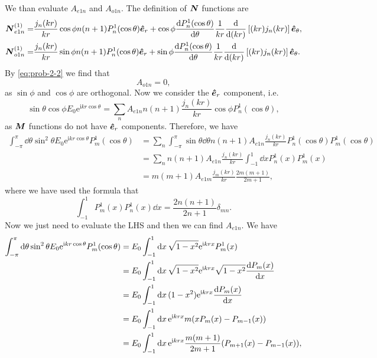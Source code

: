 \documentclass[hyperref, a4paper]{article}
\newcommand*{\ii}{\mathrm{i}}
\newcommand*{\ee}{\mathrm{e}}
\begin{document}
We than evaluate $A_{e1n}$ and $A_{o1n}$. The definition of $\vb*{N}$ functions are
\begin{equation}
    \begin{aligned}
        \boldsymbol{N}^{(1)}_{e 1 n}=& \frac{j_{n}(k r)}{k r} \cos \phi n(n+1) P_{n}^{1}(\cos \theta) \vu*{e}_{r} +\cos \phi \frac{\mathrm{d} P_{n}^{1}(\cos \theta)}{\mathrm{d} \theta} \frac{1}{k r} \frac{\mathrm{d}}{\mathrm{d}(k r)}\left[(k r) j_{n}(k r)\right] \vu*{e}_{\theta} , \\
        \boldsymbol{N}^{(1)}_{o 1 n}=& \frac{j_{n}(k r)}{k r} \sin \phi n(n+1) P_{n}^{1}(\cos \theta) \vu*{e}_{r} +\sin \phi \frac{\mathrm{d} P_{n}^{1}(\cos \theta)}{\mathrm{d} \theta} \frac{1}{k r} \frac{\mathrm{d}}{\mathrm{d}(k r)}\left[(k r) j_{n}(k r)\right] \vu*{e}_{\theta} .
        \end{aligned}
\end{equation}
By \eqref{eq:prob-2-2} we find that 
\begin{equation}
    A_{o1n} = 0,
    \label{eq:ao1n-0}
\end{equation}
as $\sin \phi$ and $\cos \phi$ are orthogonal. Now we consider the $\vu*{e}_r$ component, i.e.
\[
    \sin\theta \cos\phi E_0 \ee^{\ii k r \cos\theta} = \sum_n A_{e1n} n(n+1) \frac{j_n(kr)}{kr} \cos \phi P_{n}^{1}(\cos \theta),
\] 
as $\vb*{M}$ functions do not have $\vu*{e}_r$ components.
Therefore, we have 
\begin{equation}
    \begin{aligned}
        \int_{-\pi}^\pi \dd{\theta} \sin^2\theta E_0 \ee^{\ii k r \cos\theta} P_m^1(\cos\theta) &= \sum_n \int_{-\pi}^\pi \sin\theta \dd{\theta} n(n+1) A_{e1n} \frac{j_n(kr)}{kr} P_n^1(\cos\theta) P_m^1(\cos\theta) \\
        &= \sum_n n(n+1) A_{e1n} \frac{j_n(kr)}{kr} \int_{-1}^1 \dd{x} P_n^1(x) P_m^1(x) \\
        &= m(m+1) A_{e1m} \frac{j_m(kr)}{kr} \frac{2m (m+1)}{2m+1},
    \end{aligned}
    \label{eq:ae1m-step-1}
\end{equation}
where we have used the formula that 
\[
    \int^1_{-1} P^1_m(x) P^1_n(x) \dd{x} = \frac{2 n (n+1)}{2n+1} \delta_{mn}.
\]
Now we just need to evaluate the LHS and then we can find $A_{e1n}$.
We have 
\begin{equation}
    \begin{aligned}
        \int_{-\pi}^\pi \dd{\theta} \sin^2\theta E_0 \ee^{\ii k r \cos\theta} P_m^1(\cos\theta) &= E_0 \int_{-1}^1 \dd{x} \sqrt{1-x^2} \ee^{\ii k r x} P_m^1(x) \\
        &= E_0 \int_{-1}^1 \dd{x} \sqrt{1-x^2} \ee^{\ii k r x} \sqrt{1-x^2} \dv{P_m(x)}{x} \\
        &= E_0 \int_{-1}^1 \dd{x} (1-x^2) \ee^{\ii k r x} \dv{P_m(x)}{x} \\
        &= E_0 \int_{-1}^1 \dd{x} \ee^{\ii k r x} m(x P_m(x) - P_{m-1}(x)) \\
        &= E_0 \int_{-1}^1 \dd{x} \ee^{\ii k r x} \frac{m(m+1)}{2m+1} (P_{m+1}(x) - P_{m-1}(x)),
    \end{aligned}
    \label{eq:ae1m-step-2}
\end{equation}
\end{document}
